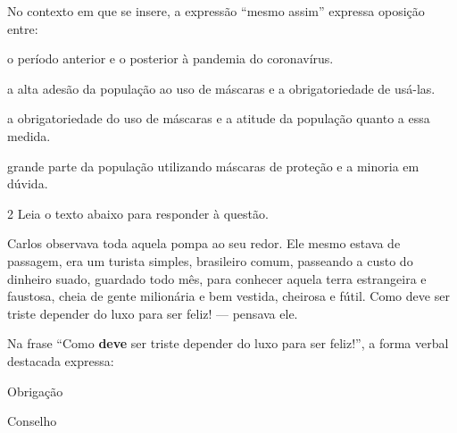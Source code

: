 {\begin{myquote}
\end{myquote}


No contexto em que se insere, a expressão ``mesmo assim'' expressa oposição entre:


\begin{escolha}

  \item o período anterior e o posterior à pandemia do coronavírus.

  \item a alta adesão da população ao uso de máscaras e a obrigatoriedade de usá-las.

  \item a obrigatoriedade do uso de máscaras e a atitude da população quanto a essa medida.

  \item grande parte da população utilizando máscaras de proteção e a minoria em dúvida.

\end{escolha}


\num{2} Leia o texto abaixo para responder à questão. 

\begin{myquote}

Carlos observava toda aquela pompa ao seu redor. Ele mesmo estava de passagem,
era um turista simples, brasileiro comum, passeando a custo do dinheiro suado, 
guardado todo mês, para conhecer aquela terra estrangeira e faustosa, cheia de 
gente milionária e bem vestida, cheirosa e fútil. Como deve ser triste depender
do luxo para ser feliz! --- pensava ele.     

\end{myquote}


Na frase ``Como \textbf{deve} ser triste depender do luxo para ser feliz!'', 
a forma verbal destacada expressa:



\begin{escolha}
  
  \item Obrigação
  
  \item Conselho
  

\end{escolha}}
